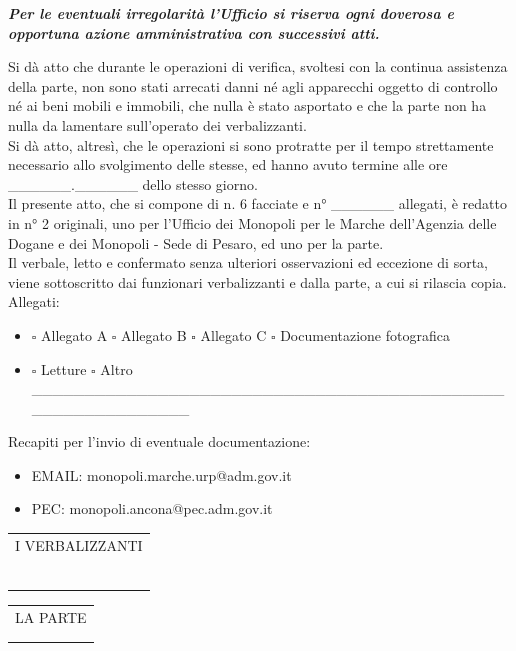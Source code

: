 \documentclass[12pt]{article}
\makeatletter
\newcommand\signature{%
  \par\vspace{8ex}\noindent
  \begin{tabular}[t]{@{}c@{}}
    I VERBALIZZANTI\\ \\
    \makebox[15em]{\dotfill}\\
    \\
    \makebox[15em]{\dotfill}\\
    \\
    \makebox[15em]{\dotfill}
  \end{tabular}
  \hfill
  \begin{tabular}[t]{@{}c@{}}
    LA PARTE\\ \\
    \makebox[15em]{\dotfill}
  \end{tabular}
}
\makeatother
\begin{document}
\textit{\textbf{Per le eventuali irregolarità l'Ufficio si riserva ogni doverosa e opportuna azione amministrativa con successivi atti.}}


Si dà atto che durante le operazioni di verifica, svoltesi con la continua assistenza della parte, non sono stati arrecati danni né agli apparecchi oggetto di controllo né ai beni mobili e immobili, che nulla è stato asportato e che la parte non ha nulla da lamentare sull’operato dei verbalizzanti.\\
Si dà atto, altresì, che le operazioni si sono protratte per il tempo strettamente necessario allo svolgimento delle stesse, ed hanno avuto termine alle ore \_\_\_\_\_\_.\_\_\_\_\_\_ dello stesso giorno.\\
Il presente atto, che si compone di n. 6 facciate e n° \_\_\_\_\_\_ allegati, è redatto in n° 2 originali, uno per l’Ufficio dei Monopoli per le Marche dell’Agenzia delle Dogane e dei Monopoli - Sede di Pesaro, ed uno per la parte.\\
Il verbale, letto e confermato senza ulteriori osservazioni ed eccezione di sorta, viene sottoscritto dai funzionari verbalizzanti e dalla parte, a cui si rilascia copia.\\


Allegati:
\begin{itemize}[label={}]
    \item \begin{math}\square\end{math} Allegato A \begin{math}\square\end{math} Allegato B \begin{math}\square\end{math} Allegato C \begin{math}\square\end{math} Documentazione fotografica
    \item \begin{math}\square\end{math} Letture \begin{math}\square\end{math} Altro \_\_\_\_\_\_\_\_\_\_\_\_\_\_\_\_\_\_\_\_\_\_\_\_\_\_\_\_\_\_\_\_\_\_\_\_\_\_\_\_\_\_\_\_\_\_\_\_\_\_\_\_\_\_\_\_\_\_\_\_
\end{itemize}

Recapiti per l'invio di eventuale documentazione:
\begin{itemize}[label={}]
    \item EMAIL: monopoli.marche.urp@adm.gov.it
    \item PEC: monopoli.ancona@pec.adm.gov.it
\end{itemize}

\signature
\end{document}

